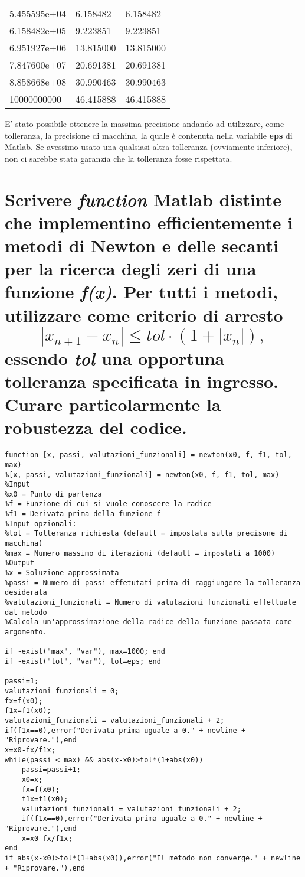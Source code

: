 \documentclass[10pt,a4paper]{article}
\begin{document}
\begin{center}
\begin{tabular}{ |p{2.7cm}||p{2.7cm}|p{2.7cm}| }
    5.455595e+04    & 6.158482        & 6.158482                \\
    6.158482e+05    & 9.223851        & 9.223851                \\
    6.951927e+06    & 13.815000       & 13.815000               \\
    7.847600e+07    & 20.691381       & 20.691381               \\
    8.858668e+08    & 30.990463       & 30.990463               \\
    10000000000     & 46.415888       & 46.415888               \\
    \hline
  \end{tabular}
\end{center}

E' stato possibile ottenere la massima precisione andando ad utilizzare, come tolleranza,
la precisione di macchina, la quale è contenuta nella variabile \textbf{eps} di Matlab.
Se avessimo usato una qualsiasi altra tolleranza (ovviamente inferiore), non ci sarebbe
stata garanzia che la tolleranza fosse rispettata.

\section{Scrivere \textit{function} Matlab distinte che implementino efficientemente i metodi di Newton
e delle secanti per la ricerca degli zeri di una funzione \textit{f(x)}. Per tutti i metodi, utilizzare
come criterio di arresto $$ |x_{n+1} - x_n| \le \textit{tol} \cdot (1 + |x_n|),  $$
essendo \textit{tol} una opportuna tolleranza specificata in ingresso.
Curare particolarmente la robustezza del codice.}
\begin{lstlisting}[style=Matlab-editor]
  function [x, passi, valutazioni_funzionali] = newton(x0, f, f1, tol, max)
%[x, passi, valutazioni_funzionali] = newton(x0, f, f1, tol, max)
%Input
%x0 = Punto di partenza
%f = Funzione di cui si vuole conoscere la radice
%f1 = Derivata prima della funzione f
%Input opzionali:
%tol = Tolleranza richiesta (default = impostata sulla precisone di macchina)
%max = Numero massimo di iterazioni (default = impostati a 1000)
%Output
%x = Soluzione approssimata
%passi = Numero di passi effetutati prima di raggiungere la tolleranza desiderata 
%valutazioni_funzionali = Numero di valutazioni funzionali effettuate dal metodo
%Calcola un'approssimazione della radice della funzione passata come argomento.

if ~exist("max", "var"), max=1000; end
if ~exist("tol", "var"), tol=eps; end

passi=1;
valutazioni_funzionali = 0;
fx=f(x0);
f1x=f1(x0);
valutazioni_funzionali = valutazioni_funzionali + 2;
if(f1x==0),error("Derivata prima uguale a 0." + newline + "Riprovare."),end
x=x0-fx/f1x;
while(passi < max) && abs(x-x0)>tol*(1+abs(x0))
    passi=passi+1;
    x0=x;
    fx=f(x0);
    f1x=f1(x0);
    valutazioni_funzionali = valutazioni_funzionali + 2;
    if(f1x==0),error("Derivata prima uguale a 0." + newline + "Riprovare."),end
    x=x0-fx/f1x;
end
if abs(x-x0)>tol*(1+abs(x0)),error("Il metodo non converge." + newline + "Riprovare."),end
\end{lstlisting}
\end{document}
